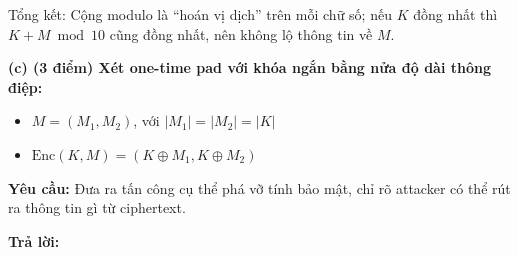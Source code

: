 Tổng kết: Cộng modulo là ``hoán vị dịch'' trên mỗi chữ số; nếu $K$ đồng nhất thì $K + M \bmod 10$ cũng đồng nhất, nên không lộ thông tin về $M$.

\textbf{(c) (3 điểm) Xét one-time pad với khóa ngắn bằng nửa độ dài thông điệp:}

\begin{itemize}
    \item $M = (M_1, M_2)$, với $|M_1| = |M_2| = |K|$
    \item $\text{Enc}(K, M) = (K \oplus M_1, K \oplus M_2)$
\end{itemize}

\textbf{Yêu cầu:} Đưa ra tấn công cụ thể phá vỡ tính bảo mật, chỉ rõ attacker có thể rút ra thông tin gì từ ciphertext.

\vspace{0.5em}
\textbf{Trả lời:}

